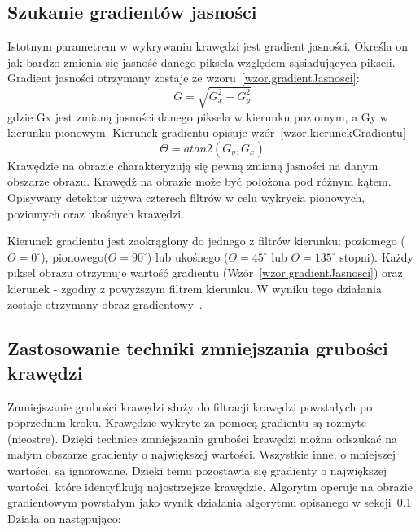 \documentclass[a4paper,twoside,12pt]{book}
\begin{document}
    \subsection{Szukanie gradientów jasności}\label{subsec:szukanie-gradientów-jasności}
    Istotnym parametrem w wykrywaniu krawędzi jest gradient jasności.
    Określa on jak bardzo zmienia się jasność danego piksela względem sąsiadujących pikseli.
    Gradient jasności otrzymany zostaje ze wzoru~\ref{wzor.gradientJasnosci}:
    \large
    \begin{equation}
        G = \sqrt{G_{x}^{2} + G_{y}^{2}}
        \label{wzor.gradientJasnosci}
    \end{equation}
    \normalsize
    gdzie Gx jest zmianą jasności danego piksela w kierunku poziomym, a Gy w kierunku pionowym.
    Kierunek gradientu opisuje wzór~\ref{wzor.kierunekGradientu}
    \large
    \begin{equation}
        \Theta = atan2(G_{y}, G_{x})
        \label{wzor.kierunekGradientu}
    \end{equation}
    \normalsize
    Krawędzie na obrazie charakteryzują się pewną zmianą jasności na danym obszarze obrazu.
    Krawędź na obrazie może być położona pod różnym kątem.
    Opisywany detektor używa czterech filtrów w celu wykrycia pionowych, poziomych oraz ukośnych krawędzi.

    Kierunek gradientu jest zaokrąglony do jednego z filtrów kierunku: poziomego ($\Theta = 0^{\circ}$),
    pionowego($\Theta = 90^{\circ}$) lub ukośnego ($\Theta = 45^{\circ}$
    lub $\Theta = 135^{\circ}$ stopni).
    Każdy piksel obrazu otrzymuje wartość gradientu (Wzór~\ref{wzor.gradientJasnosci})
    oraz kierunek - zgodny z powyższym filtrem kierunku.
    W wyniku tego działania zostaje otrzymany obraz gradientowy~\cite{Canny}.
    \subsection{Zastosowanie techniki zmniejszania grubości
    krawędzi}\label{subsec:zastosowanie-zmniejszania-grubości-krawędzi}
    Zmniejszanie grubości krawędzi służy do filtracji krawędzi powstałych po poprzednim kroku.
    Krawędzie wykryte za pomocą gradientu są rozmyte (nieostre).
    Dzięki technice zmniejszania grubości krawędzi można odszukać na małym obszarze gradienty o największej wartości.
    Wszystkie inne, o mniejszej wartości, są ignorowane.
    Dzięki temu pozostawia się gradienty o największej wartości, które identyfikują najostrzejsze krawędzie.
    Algorytm operuje na obrazie gradientowym powstałym jako wynik działania algorytmu opisanego w sekcji~\ref{subsec:szukanie-gradientów-jasności}
    Działa on następująco:
\end{document}
